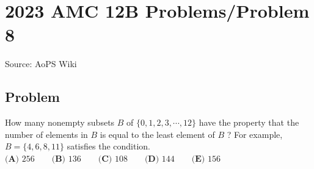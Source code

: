 \documentclass[12pt]{article}
\begin{document}
\section*{{2023 AMC 12B Problems/Problem 8}}
Source: AoPS Wiki

\subsection*{Problem}
How many nonempty subsets $B$ of $\{0, 1, 2, 3, \cdots, 12\}$ have the property that the number of elements in $B$ is equal to the least element of $B$ ? For example, $B = \{4, 6, 8, 11\}$ satisfies the condition. $\textbf{(A) } 256 \qquad\textbf{(B) } 136 \qquad\textbf{(C) } 108 \qquad\textbf{(D) } 144 \qquad\textbf{(E) } 156$
\end{document}
